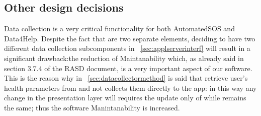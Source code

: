 \documentclass[../DD0.tex]{subfiles}
\begin{document}
  \subsection{Other design decisions}
  \label{sec:designdecisions}
  Data collection is a very critical functionality for both AutomatedSOS and Data4Help.
  Despite the fact that are two separate elements, deciding to have two different data collection subcomponents in ~\ref{sec:applserverinterf} will result in a significant drawback:the reduction of Maintanability which, as already said in section 3.7.4 of the RASD document, is a very important aspect of our software.
  This is the reason why in ~\ref{sec:datacollectormethod} is said that \EmergencyDetector  retrieve user's health parameters from \DataCollector  and not collects them directly to the app: in this way any change in the presentation layer will requires the update only of \DataCollector  while \EmergencyDetector  remains the same; thus the software Manintanability is increased.  
\end{document}
